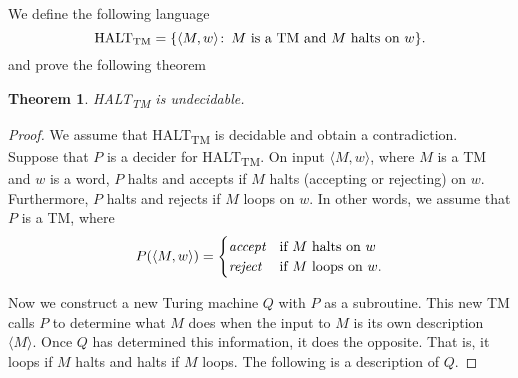 \documentclass{article}
\newcommand{\theoremname}{Theorem}
\newtheorem{theorem}{\theoremname}
\newcommand{\st}{\colon\,}
\newcommand{\TM}{TM}
\newcommand{\HALTtm}{HALT\textsubscript{TM}}
\begin{document}
We define the following language
\begin{displaymath}
\text{\HALTtm{}} = \{ \langle M,w \rangle \st \text{\(M\) is a \TM{} and \(M\)
halts on \(w\)} \}.
\end{displaymath}
and prove the following theorem
\begin{theorem}\label{HALTtm}
\HALTtm{} is undecidable.
\end{theorem}
\begin{proof}
We assume that HALT\textsubscript{TM} is decidable and obtain a contradiction.
Suppose that \(P\) is a decider for \HALTtm{}.
On input \(\langle M, w \rangle\), where \(M\) is a \TM{} and \(w\) is a
word, \(P\) halts and accepts if \(M\) halts (accepting or rejecting) on \(w\).
Furthermore, \(P\) halts and rejects if
\(M\) loops on \(w\).
In other words, we assume that \(P\) is a \TM{}, where
\begin{displaymath}
P(\langle M, w\rangle) = \begin{cases}
	\emph{accept}&\text{if \(M\) halts on \(w\)}\\
	\emph{reject}&\text{if \(M\) loops on \(w\)}.
\end{cases}
\end{displaymath}

Now we construct a new Turing machine \(Q\) with \(P\) as a subroutine. This
new \TM{} calls \(P\) to determine what \(M\) does when the input to \(M\)
is its own
description \(\langle M \rangle\).
Once \(Q\) has determined this information, it does the opposite.
That is, it loops if \(M\) halts and halts if \(M\) loops.
The following is a description of \(Q\).


\end{proof}
\end{document}
